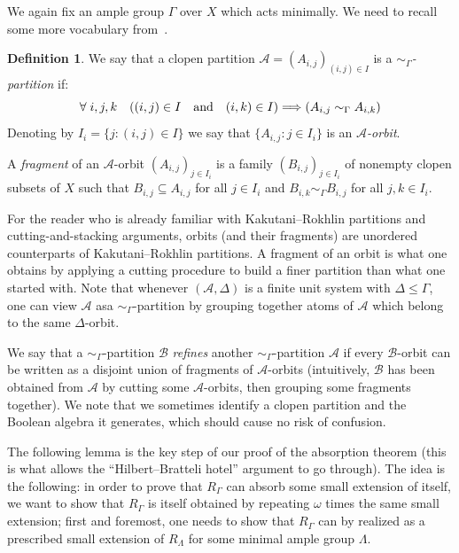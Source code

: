 \documentclass[10pt,a4paper]{article}
\theoremstyle{definition}
\newtheorem{defi}[theo]{Definition}
\newcommand{\mcA}{\mathcal{A}}
\newcommand{\mcB}{\mathcal{B}}
\let\oldforall\forall
\renewcommand*{\forall}{\mathrel{\oldforall}}
\newcounter{setofstep}
\newcounter{step}[setofstep]
\newcommand*{\To}{\mathchoice{\Longrightarrow}{\Rightarrow}{\Rightarrow}{\Rightarrow}}
\begin{document}
We again fix an ample group $\Gamma$ over $X$ which acts minimally. We need to recall some more vocabulary from~\cite{Melleray2023}.

\begin{defi}
We say that a clopen partition $\mcA=(A_{i,j})_{(i,j) \in I}$ is a \emph{$\sim_\Gamma$-partition} if:
\[
\forall i,j,k \quad ((i,j) \in I \quad\text{and}\quad (i,k) \in I) \To (A_{i,j} \sim_\Gamma A_{i,k})
\]
Denoting by $I_i=\{j : (i,j) \in I\}$ we say that $\{A_{i,j} : j \in I_i\}$ is an \emph{$\mcA$-orbit}.

A \emph{fragment} of an $\mcA$-orbit $(A_{i,j})_{j \in I_i}$ is a family $(B_{i,j})_{j \in I_i}$ of nonempty clopen subsets of $X$ such that $B_{i,j} \subseteq A_{i,j}$ for all $j \in I_i$ and $B_{i,k} \sim_\Gamma B_{i,j}$ for all $j,k \in I_i$.
\end{defi}

For the reader who is already familiar with Kakutani--Rokhlin partitions and cutting-and-stacking arguments, orbits (and their fragments) are unordered counterparts of Kakutani--Rokhlin partitions.
A fragment of an orbit is what one obtains by applying a cutting procedure to build a finer partition than what one started with. Note that whenever $(\mcA,\Delta)$ is a finite unit system with $\Delta \le \Gamma$, one can view $\mcA$ as\linebreak a $\sim_\Gamma$-partition by grouping together atoms of $\mcA$ which belong to the same $\Delta$-orbit.

We say that a $\sim_\Gamma$-partition $\mcB$ \emph{refines} another $\sim_\Gamma$-partition $\mcA$ if every $\mcB$-orbit can be written as a disjoint union of fragments of $\mcA$-orbits (intuitively, $\mcB$ has been obtained from $\mcA$ by cutting some $\mcA$-orbits, then grouping some fragments together). We note that we sometimes identify a clopen partition and the Boolean algebra it generates, which should cause no risk of confusion.



The following lemma is the key step of our proof of the absorption theorem (this is what allows the ``Hilbert--Bratteli hotel'' argument to go through). The idea is the following: in order to prove that $R_\Gamma$ can absorb some small extension of itself, we want to show that $R_\Gamma$ is itself obtained by repeating $\omega$ times the same small extension; first and foremost, one needs to show that $R_\Gamma$ can by realized as a prescribed small extension of $R_\Lambda$ for some minimal ample group $\Lambda$.
\end{document}
